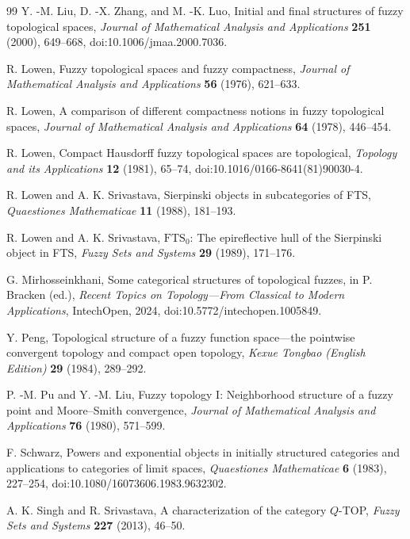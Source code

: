 \documentclass[11pt,a4paper]{article}
\numberwithin{equation}{section}
\theoremstyle{definition}
\theoremstyle{remark}
\begin{document}
\begin{thebibliography}{99}
Y. -M. Liu, D. -X. Zhang, and M. -K. Luo,
Initial and final structures of fuzzy topological spaces,
\emph{Journal of Mathematical Analysis and Applications}
\textbf{251} (2000), 649--668,
doi:10.1006/jmaa.2000.7036.

R. Lowen,
Fuzzy topological spaces and fuzzy compactness,
\emph{Journal of Mathematical Analysis and Applications}
\textbf{56} (1976), 621--633.

R. Lowen,
A comparison of different compactness notions in fuzzy topological spaces,
\emph{Journal of Mathematical Analysis and Applications}
\textbf{64} (1978), 446--454.

R. Lowen,
Compact Hausdorff fuzzy topological spaces are topological,
\emph{Topology and its Applications}
\textbf{12} (1981), 65--74,
doi:10.1016/0166-8641(81)90030-4.

R. Lowen and A. K. Srivastava,
Sierpinski objects in subcategories of FTS,
\emph{Quaestiones Mathematicae}
\textbf{11} (1988), 181--193.

R. Lowen and A. K. Srivastava,
\(\mathrm{FTS}_0\): The epireflective hull of the Sierpinski object in FTS,
\emph{Fuzzy Sets and Systems}
\textbf{29} (1989), 171--176.

G. Mirhosseinkhani,
Some categorical structures of topological fuzzes,
in P. Bracken (ed.), \emph{Recent Topics on Topology---From Classical
to Modern Applications}, IntechOpen, 2024,
doi:10.5772/intechopen.1005849.

Y. Peng,
Topological structure of a fuzzy function space---the pointwise convergent
topology and compact open topology,
\emph{Kexue Tongbao (English Edition)}
\textbf{29} (1984), 289--292.

P. -M. Pu and Y. -M. Liu,
Fuzzy topology I: Neighborhood structure of a fuzzy point and
Moore--Smith convergence,
\emph{Journal of Mathematical Analysis and Applications}
\textbf{76} (1980), 571--599.

F. Schwarz,
Powers and exponential objects in initially structured categories and
applications to categories of limit spaces,
\emph{Quaestiones Mathematicae}
\textbf{6} (1983), 227--254,
doi:10.1080/16073606.1983.9632302.

A. K. Singh and R. Srivastava,
A characterization of the category \(Q\)-TOP,
\emph{Fuzzy Sets and Systems}
\textbf{227} (2013), 46--50.


\end{thebibliography}
\end{document}
